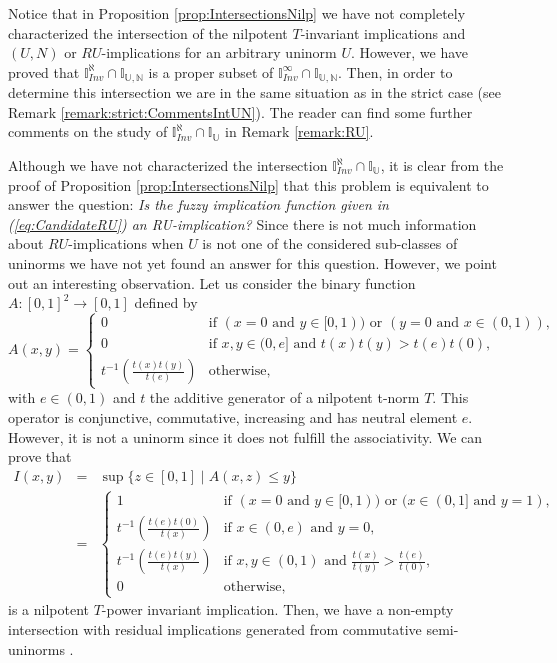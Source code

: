 Notice that in Proposition \ref{prop:IntersectionsNilp} we have not completely characterized the intersection of the nilpotent $T$-invariant implications and $(U,N)$ or $RU$-implications for an arbitrary uninorm $U$. However, we have proved that $\mathbb{I}^{\aleph}_{Inv} \cap \mathbb{I}_{\mathbb{U},\mathbb{N}}$ is  a proper subset of $\mathbb{I}^{\infty}_{Inv} \cap \mathbb{I}_{\mathbb{U},\mathbb{N}}$. Then, in order to determine this intersection we are in the same situation as in the strict case (see Remark \ref{remark:strict:CommentsIntUN}). The reader can find some further comments on the study of  $\mathbb{I}^{\aleph}_{Inv} \cap \mathbb{I}_{\mathbb{U}}$ in Remark \ref{remark:RU}.

\begin{remark}\label{remark:RU}
	Although we have not characterized the intersection $\mathbb{I}^{\aleph}_{Inv} \cap \mathbb{I}_{\mathbb{U}}$, it is clear from the proof of Proposition \ref{prop:IntersectionsNilp} that this problem is equivalent to answer the question: \emph{Is the fuzzy implication function given in (\ref{eq:CandidateRU}) an RU-implication?} Since there is not much information about $RU$-implications when $U$ is not one of the considered sub-classes of uninorms we have not yet found an answer for this question. However, we point out an interesting observation. Let us consider the binary function $A:[0,1]^2 \to [0,1]$ defined by
	$$
	A(x,y)
	=
	\left\{ \begin{array}{ll}
		0 & \text{if } (x=0 \text{ and } y \in [0,1)) \text{ or } (y=0 \text{ and } x \in (0,1)),\\
		0 & \text{if } x,y \in (0,e] \text{ and } t(x)t(y)>t(e)t(0),\\
		t^{-1} \left(\frac{t(x)t(y)}{t(e)}\right) & \text{otherwise,}				
	\end{array}
	\right.
	$$
	with $e \in (0,1)$ and $t$ the additive generator of a nilpotent t-norm $T$. This operator is conjunctive, commutative, increasing and has neutral element $e$. However, it is not a uninorm since it does not fulfill the associativity. We can prove that 
	\begin{eqnarray*}
	I(x,y)
	&=&\sup \{z \in [0,1] \mid  A(x,z) \leq y\} \\
	&=&
	\left\{ \begin{array}{ll}
		1 & \text{if } (x=0 \text{ and } y \in [0,1)) \text{ or } (x \in (0,1] \text{ and } y=1),\\
		t^{-1} \left(\frac{t(e)t(0)}{t(x)}\right) & \text{if }   x \in (0,e) \text{ and } y=0, \\
		t^{-1} \left(\frac{t(e)t(y)}{t(x)}\right) &  \text{if } x,y \in (0,1) \text{ and } \frac{t(x)}{t(y)} > \frac{t(e)}{t(0)}, \\
		0 & \text{otherwise,}				
	\end{array}
	\right.
	\end{eqnarray*}
	is a nilpotent $T$-power invariant implication. Then, we have a non-empty intersection with residual implications generated from commutative semi-uninorms \cite{Krol2011,Ouyang2012}.
\end{remark}

